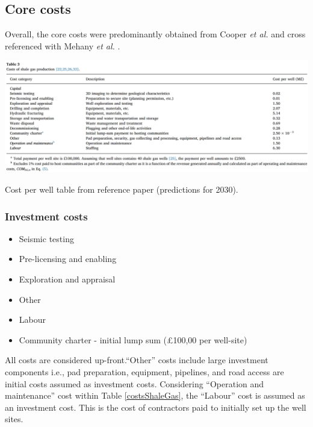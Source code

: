 \documentclass[10pt]{article}
\begin{document}
\subsection{Core costs}
Overall, the core costs were predominantly obtained from Cooper \textit{et al.} and cross referenced with Mehany \textit{et al.} \cite{COOPER2018577,MEHANY2019375}.  
\begin{table}[H]
    \centering
    \includegraphics[width = \textwidth]{fig1.png}
    \caption{Cost per well table from reference paper \cite{COOPER2018577} (predictions for 2030).}
    \label{costsShaleGas}
\end{table}
\subsubsection{Investment costs}
\begin{itemize}
    \item Seismic testing
    \item Pre-licensing and enabling
    \item Exploration and appraisal
    \item Other
    \item Labour
    \item Community charter - initial lump sum (\pounds 100,00 per well-site)
\end{itemize}
All costs are considered up-front.``Other'' costs include large investment components i.e., pad preparation, equipment, pipelines, and road access are initial costs assumed as investment costs. Considering ``Operation and maintenance'' cost within Table \ref{costsShaleGas}, the ``Labour'' cost is assumed as an investment cost. This is the cost of contractors paid to initially set up the well sites.
\end{document}
